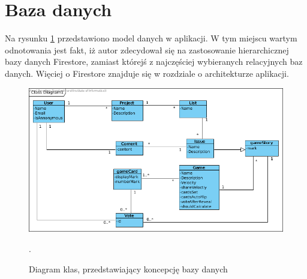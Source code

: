 \section{Baza danych}

Na rysunku \ref{rys:ClassDiagram} przedstawiono model danych w aplikacji.
W tym miejscu wartym odnotowania jest fakt, iż autor zdecydował się
na zastosowanie hierarchicznej bazy danych Firestore, zamiast którejś z najczęściej
wybieranych relacyjnych baz danych.
Więciej o Firestore znajduje się w rozdziale o architekturze aplikacji.

\begin{figure}[H]
	\centering\includegraphics[width=\textwidth]{img/ClassDiagram}
	\caption{Diagram klas, przedstawiający koncepcję bazy danych}.
	\label{rys:ClassDiagram}
\end{figure}
